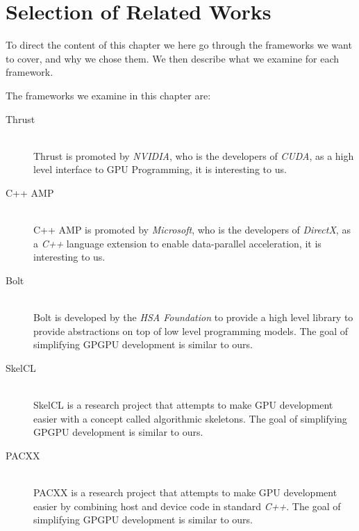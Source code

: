 \section{Selection of Related Works}


To direct the content of this chapter we here go through the frameworks we want to cover, and why we chose them. We then describe what we examine for each framework.

The frameworks we examine in this chapter are:
\begin{description}
\item[Thrust] \hfill \\
Thrust is promoted by \textit{NVIDIA}, who is the developers of \textit{CUDA}, as a high level interface to GPU Programming, it is interesting to us\cite{thrustNvidia}.
\item[C++ AMP] \hfill \\
C++ AMP is promoted by \textit{Microsoft}, who is the developers of \textit{DirectX}, as a \textit{C++} language extension to enable data-parallel acceleration, it is interesting to us\cite{microsoftCppAMP}.
\item[Bolt] \hfill \\
Bolt is developed by the \textit{HSA Foundation} to provide a high level library to provide abstractions on top of low level programming models. The goal of simplifying GPGPU development is similar to ours\cite{boltDoc}.
\item[SkelCL] \hfill \\
SkelCL is a research project that attempts to make GPU development easier with a concept called algorithmic skeletons. The goal of simplifying GPGPU development is similar to ours\cite{skelclPaper}.
\item[PACXX] \hfill \\
PACXX is a research project that attempts to make GPU development easier by combining host and device code in standard \textit{C++}. The goal of simplifying GPGPU development is similar to ours\cite{pacxxPaper}.
\end{description}

